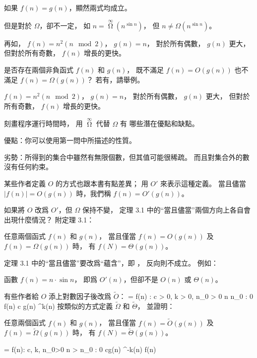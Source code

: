 如果 $f(n) = g(n)$，顯然兩式均成立。

但是對於 $\Omega$，卻不一定，
如 $n = \mathop{\Omega}\limits^{\infty}(n^{\sin{n}})$，
但 $n \ne \Omega(n^{\sin{n}})$。

再如， $f(n)=n^2(n\mod 2)$， $g(n)=n$，
對於所有偶數， $g(n)$ 更大，
但對於所有奇數， $f(n)$ 增長的更快。
\stopANSWER
\stopitem

\startitem
是否存在兩個非負函式 $f(n)$ 和 $g(n)$，
既不滿足 $f(n)=O(g(n))$ 也不滿足 $f(n)=\Omega(g(n))$？
若有，請舉例。

\startANSWER
$f(n)=n^2(n\mod 2)$， $g(n)=n$，
對於所有偶數， $g(n)$ 更大，
但對於所有奇數， $f(n)$ 增長的更快。
\stopANSWER
\stopitem

\startitem
刻畫程序運行時間時，
用 $\mathop{\Omega}\limits^{\infty}$ 代替 $\Omega$ 有
哪些潛在優點和缺點。

\startANSWER
優點：你可以使用第一問中所描述的性質。

劣勢：所得到的集合中雖然有無限個數，但其值可能很稀疏。
而且對集合外的數沒有任何約束。
\stopANSWER
\stopitem

\stopigBase

某些作者定義 $O$ 的方式也跟本書有點差異；
用 $O'$ 來表示這種定義。
當且儘當 $|f(n)| = O(g(n))$ 時，我們稱 $f(n) = O'(g(n))$。

\startigBase[a,continue]
\startitem
如果將 $O$ 改爲 $O'$，但 $\Omega$ 保持不變，
定理 3.1 中的“當且儘當”兩個方向上各自會出現什麼情況？
附定理 3.1：

任意兩個函式 $f(n)$ 和 $g(n)$，
當且僅當 $f(n)=O(g(n))$ 及 $f(n)=\Omega(g(n))$ 時，
有 $f(N)=\Theta(g(n))$。

\startANSWER
定理 3.1 中的“當且儘當”要改爲“蘊含”，即 ，
反向則不成立。
例如：

函數 $f(n) = n \cdot \sin{n}$，
即爲 $O'(n)$，但卻不是 $O(n)$ 或 $\Theta(n)$。
\stopANSWER
\stopitem
\stopigBase

有些作者給 $O$ 添上對數因子後改爲 $\tilde{O}$：
\startformula
{} = \lbrace f(n)
 : \exists c > 0, k > 0, n_0 > 0
\forall n \ge n_0
 : 0 \le f(n) \le c g(n) \lg^k(n) \rbrace
\stopformula
\startigBase[a,continue]
\startitem
按類似的方式定義 $\tilde{\Omega}$ 和 $\tilde{\Theta}$，
並證明：

任意兩個函式 $f(n)$ 和 $g(n)$，
當且僅當 $f(n)=\tilde{O}(g(n))$ 及 $f(n)=\tilde{\Omega}(g(n))$ 時，
有 $f(N)=\tilde{\Theta}(g(n))$。

\startANSWER
\startsplitformula\startmathalignment
\NC \tilde{\Omega} = \lbrace f(n): \NC
  \exists c, k, n_0>0 \NR
\NC \NC \forall n > n_0
  : 0 \leq cg(n) \lg^{-k}(n) \leq f(n) \rbrace \NR

